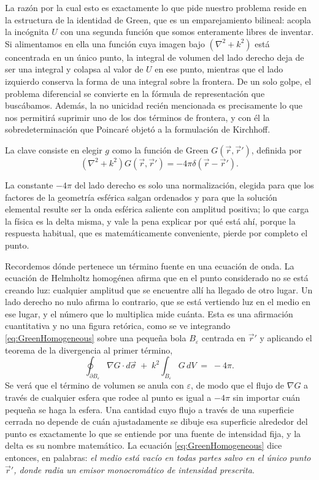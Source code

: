 		La razón por la cual esto es exactamente lo que pide nuestro problema reside en la estructura de la identidad de Green, que es un emparejamiento bilineal: acopla la incógnita $U$ con una segunda función que somos enteramente libres de inventar. Si alimentamos en ella una función cuya imagen bajo $(\nabla^{2}+k^{2})$ está concentrada en un único punto, la integral de volumen del lado derecho deja de ser una integral y colapsa al valor de $U$ en ese punto, mientras que el lado izquierdo conserva la forma de una integral sobre la frontera. De un solo golpe, el problema diferencial se convierte en la fórmula de representación que buscábamos. Además, la no unicidad recién mencionada es precisamente lo que nos permitirá suprimir uno de los dos términos de frontera, y con él la sobredeterminación que Poincaré objetó a la formulación de Kirchhoff.

		La clave consiste en elegir $g$ como la función de Green $G(\vec{r}, \vec{r}')$, definida por
		\begin{equation}\label{eq:GreenHomogeneous}
			\left(\nabla^2 + k^2\right)G(\vec{r}, \vec{r}') = -4\pi \delta(\vec{r} - \vec{r}').
		\end{equation}

		La constante $-4\pi$ del lado derecho es solo una normalización, elegida para que los factores de la geometría esférica salgan ordenados y para que la solución elemental resulte ser la onda esférica saliente con amplitud positiva; lo que carga la física es la delta misma, y vale la pena explicar por qué está ahí, porque la respuesta habitual, que es matemáticamente conveniente, pierde por completo el punto.

		Recordemos dónde pertenece un término fuente en una ecuación de onda. La ecuación de Helmholtz homogénea afirma que en el punto considerado no se está creando luz: cualquier amplitud que se encuentre allí ha llegado de otro lugar. Un lado derecho no nulo afirma lo contrario, que se está vertiendo luz en el medio en ese lugar, y el número que lo multiplica mide cuánta. Esta es una afirmación cuantitativa y no una figura retórica, como se ve integrando \eqref{eq:GreenHomogeneous} sobre una pequeña bola $B_{\varepsilon}$ centrada en $\vec{r}'$ y aplicando el teorema de la divergencia al primer término,
		\begin{equation}\label{eq:GreenFlux}
			\oint_{\partial B_{\varepsilon}} \nabla G \cdot d\vec{\sigma} \;+\; k^{2}\int_{B_{\varepsilon}} G\, dV \;=\; -4\pi .
		\end{equation}
		Se verá que el término de volumen se anula con $\varepsilon$, de modo que el flujo de $\nabla G$ a través de cualquier esfera que rodee al punto es igual a $-4\pi$ sin importar cuán pequeña se haga la esfera. Una cantidad cuyo flujo a través de una superficie cerrada no depende de cuán ajustadamente se dibuje esa superficie alrededor del punto es exactamente lo que se entiende por una fuente de intensidad fija, y la delta es su nombre matemático. La ecuación \eqref{eq:GreenHomogeneous} dice entonces, en palabras: \textit{el medio está vacío en todas partes salvo en el único punto $\vec{r}'$, donde radia un emisor monocromático de intensidad prescrita}.

